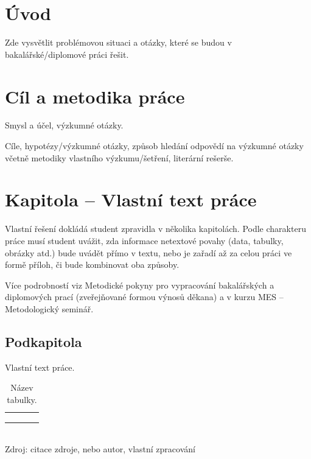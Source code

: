 \section{Úvod}

Zde vysvětlit problémovou situaci a otázky, které se budou v bakalářské/diplomové práci řešit.


\section{Cíl a metodika práce}

Smysl a účel, výzkumné otázky.  

Cíle, hypotézy/výzkumné otázky, způsob hledání odpovědí na výzkumné otázky včetně metodiky vlastního výzkumu/šetření, literární rešerše.


\section{Kapitola -- Vlastní text práce}

Vlastní řešení dokládá student zpravidla v několika kapitolách. Podle charakteru práce musí student uvážit, zda informace netextové povahy (data, tabulky, obrázky atd.) bude uvádět přímo v textu, nebo je zařadí až za celou práci ve formě příloh, či bude kombinovat oba způsoby. 

Více podrobností viz Metodické pokyny pro vypracování bakalářských a diplomových prací (zveřejňované formou výnosů děkana) a v kurzu MES -- Metodologický seminář. \cite{autor00}

\subsection{Podkapitola}

Vlastní text práce.

\begin{table}[htb!]  
\caption{Název tabulky.}

\begin{tabular}{| l | l | l | l |}
\hline
 \hspace{0.22\textwidth} & \hspace{0.22\textwidth} & \hspace{0.22\textwidth} & \hspace{0.22\textwidth} \\
\hline
 & & & \\
\hline
 & & & \\
\hline
 & & & \\
\hline
\end{tabular} \\

Zdroj: citace zdroje, nebo autor, vlastní zpracování
\end{table}

